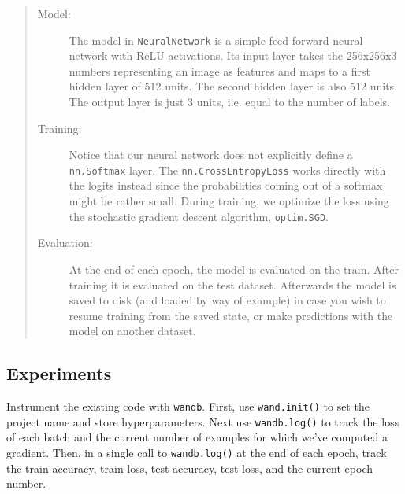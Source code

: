 \documentclass[11pt,addpoints,answers]{exam}
\begin{document}
\begin{questions}
\begin{quote}
\begin{description}
\item[Model:] The model in \lstinline{NeuralNetwork} is a simple feed forward neural network with ReLU activations. Its input layer takes the 256x256x3 numbers representing an image as features and maps to a first hidden layer of 512 units. The second hidden layer is also 512 units. The output layer is just 3 units, i.e. equal to the number of labels. 

\item[Training:] Notice that our neural network does not explicitly define a \lstinline{nn.Softmax} layer. The  \lstinline{nn.CrossEntropyLoss} works directly with the logits instead since the probabilities coming out of a softmax might be rather small. During training, we optimize the loss using the stochastic gradient descent algorithm, \lstinline{optim.SGD}.

\item[Evaluation:] At the end of each epoch, the model is evaluated on the train. After training it is evaluated on the test dataset. Afterwards the model is saved to disk (and loaded by way of example) in case you wish to resume training from the saved state, or make predictions with the model on another dataset.
    
\end{description}

\end{quote}

\subsection*{Experiments}

Instrument the existing code with \lstinline{wandb}. First, use \lstinline{wand.init()} to set the project name and store hyperparameters. Next use \lstinline{wandb.log()} to track the loss of each batch and the current number of examples for which we've computed a gradient. Then, in a single call to \lstinline{wandb.log()} at the end of each epoch, track the train accuracy, train loss, test accuracy, test loss, and the current epoch number.

\end{questions}
\end{document}
